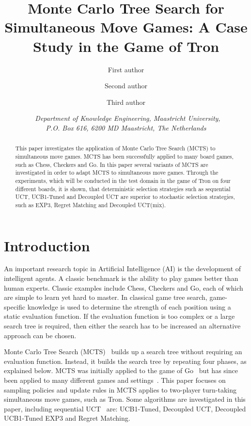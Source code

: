 \documentclass{article}
\title{\textbf{\huge Monte Carlo Tree Search for Simultaneous Move Games: A Case Study in the Game of Tron}}
\author{First author \affila \and
    Second author \affila \and
    Third author \affila}
\date{\affila\ \textit{Department of Knowledge Engineering, Maastricht University,\\ P.O. Box 616, 6200 MD Maastricht, The Netherlands}}
\begin{document}
\ttl
\thispagestyle{empty}



\begin{abstract}
\noindent This paper investigates the application of Monte Carlo Tree Search (MCTS) to simultaneous move games. MCTS has been successfully applied to many board games, such as Chess, Checkers and Go. In this paper several variants of MCTS are investigated in order to adapt MCTS to simultaneous move games. Through the experiments, which will be conducted in the test domain in the game of Tron on four different boards, it is shown, that deterministic selection strategies such as sequential UCT, UCB1-Tuned and Decoupled UCT are superior to stochastic selection strategies, such as EXP3, Regret Matching and Decoupled UCT(mix).
\end{abstract}

\section{Introduction}
\label{sec:introduction}
An important research topic in Artificial Intelligence (AI) is the development of intelligent agents. 
A classic benchmark is the ability to play games better than human experts. 
Classic examples include Chess, Checkers and Go, each of which are simple to learn yet hard to master.
In classical game tree search, game-specific knowledge is used to determine the strength of each position using a static evaluation function. %
If the evaluation function is too complex or a large search tree is required, then either the search has to be increased an alternative approach can be chosen. 

Monte Carlo Tree Search (MCTS)~\cite{chaslot_phd,coulom,kocsis} builds up a search tree without requiring an evaluation function. Instead, it builds the search tree by repeating four phases, as explained below. MCTS was initially applied to the game of Go~\cite{coulom} but has since been applied to many different games and settings~\cite{mctssurvey}. This paper focuses on sampling policies and update rules in MCTS applies to two-player turn-taking simultaneous move games, such as Tron. Some algorithms are investigated in this paper, including sequential UCT~\cite{kocsis} are: UCB1-Tuned, Decoupled UCT, Decoupled UCB1-Tuned EXP3 and Regret Matching.
\end{document}
